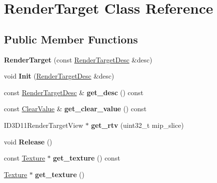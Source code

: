 \hypertarget{classRenderTarget}{}\section{Render\+Target Class Reference}
\label{classRenderTarget}
\subsection*{Public Member Functions}
\begin{DoxyCompactItemize}
\item 
\mbox{\label{classRenderTarget_af801eae25814015b122408271fa1f5a8}} 
{\bfseries Render\+Target} (const \hyperlink{structRenderTargetDesc}{Render\+Target\+Desc} \&desc)
\item 
\mbox{\label{classRenderTarget_a0a16b0dda0e080d2ed074baa0afedf67}} 
void {\bfseries Init} (\hyperlink{structRenderTargetDesc}{Render\+Target\+Desc} \&desc)
\item 
\mbox{\label{classRenderTarget_a6e76edc9273fa12f7e84ff40e44fa99e}} 
const \hyperlink{structRenderTargetDesc}{Render\+Target\+Desc} \& {\bfseries get\+\_\+desc} () const
\item 
\mbox{\label{classRenderTarget_ae1fa161727145180a87dc3f241f99990}} 
const \hyperlink{structClearValue}{Clear\+Value} \& {\bfseries get\+\_\+clear\+\_\+value} () const
\item 
\mbox{\label{classRenderTarget_a02caa8f7bfc7bdd41f77b26c09d0e96a}} 
I\+D3\+D11\+Render\+Target\+View $\ast$ {\bfseries get\+\_\+rtv} (uint32\+\_\+t mip\+\_\+slice)
\item 
\mbox{\label{classRenderTarget_a0c1f5d060a48f256cfe72942332c71c9}} 
void {\bfseries Release} ()
\item 
\mbox{\label{classRenderTarget_a4f0b08b22137ece48a3436003af4b623}} 
const \hyperlink{classTexture}{Texture} $\ast$ {\bfseries get\+\_\+texture} () const
\item 
\mbox{\label{classRenderTarget_a014f910085678d94299bedd3caa84223}} 
\hyperlink{classTexture}{Texture} $\ast$ {\bfseries get\+\_\+texture} ()
\end{DoxyCompactItemize}
